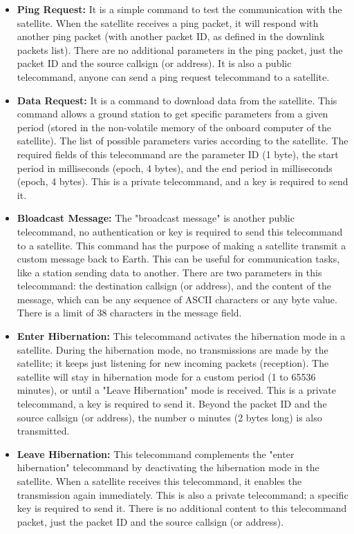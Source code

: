 \begin{itemize}
    \item \textbf{Ping Request:} It is a simple command to test the communication with the satellite. When the satellite receives a ping packet, it will respond with another ping packet (with another packet ID, as defined in the downlink packets list). There are no additional parameters in the ping packet, just the packet ID and the source callsign (or address). It is also a public telecommand, anyone can send a ping request telecommand to a satellite.
    \item \textbf{Data Request:} It is a command to download data from the satellite. This command allows a ground station to get specific parameters from a given period (stored in the non-volatile memory of the onboard computer of the satellite). The list of possible parameters varies according to the satellite. The required fields of this telecommand are the parameter ID (1 byte), the start period in milliseconds (epoch, 4 bytes), and the end period in milliseconds (epoch, 4 bytes). This is a private telecommand, and a key is required to send it.
    \item \textbf{Bloadcast Message: } The "broadcast message" is another public telecommand, no authentication or key is required to send this telecommand to a satellite. This command has the purpose of making a satellite transmit a custom message back to Earth. This can be useful for communication tasks, like a station sending data to another. There are two parameters in this telecommand: the destination callsign (or address), and the content of the message, which can be any sequence of ASCII characters or any byte value. There is a limit of 38 characters in the message field.
    \item \textbf{Enter Hibernation:} This telecommand activates the hibernation mode in a satellite. During the hibernation mode, no transmissions are made by the satellite; it keeps just listening for new incoming packets (reception). The satellite will stay in hibernation mode for a custom period (1 to 65536 minutes), or until a "Leave Hibernation" mode is received. This is a private telecommand, a key is required to send it. Beyond the packet ID and the source callsign (or address), the number o minutes (2 bytes long) is also transmitted.
    \item \textbf{Leave Hibernation:} This telecommand complements the "enter hibernation" telecommand by deactivating the hibernation mode in the satellite. When a satellite receives this telecommand, it enables the transmission again immediately. This is also a private telecommand; a specific key is required to send it. There is no additional content to this telecommand packet, just the packet ID and the source callsign (or address).

\end{itemize}
